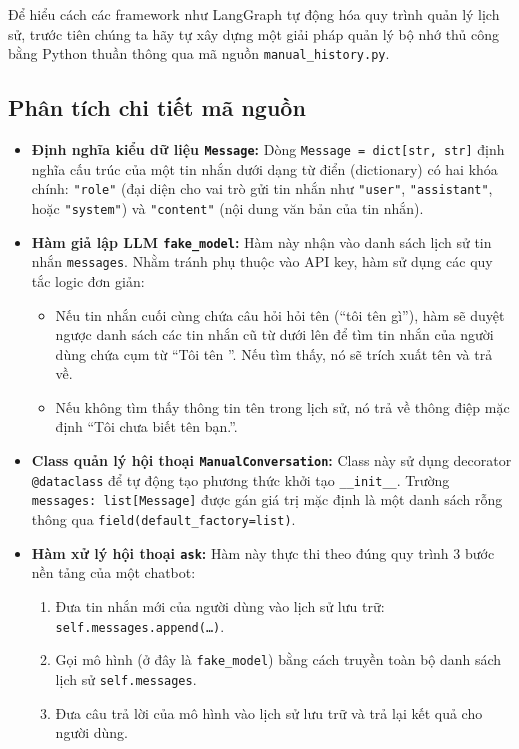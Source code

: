 Để hiểu cách các framework như LangGraph tự động hóa quy trình quản lý lịch sử, trước tiên chúng ta hãy tự xây dựng một giải pháp quản lý bộ nhớ thủ công bằng Python thuần thông qua mã nguồn \texttt{manual\_history.py}.

\begingroup

\endgroup

\subsection{Phân tích chi tiết mã nguồn}
\begin{itemize}
  \item \textbf{Định nghĩa kiểu dữ liệu \texttt{Message}:} Dòng \texttt{Message = dict[str, str]} định nghĩa cấu trúc của một tin nhắn dưới dạng từ điển (dictionary) có hai khóa chính: \texttt{"role"} (đại diện cho vai trò gửi tin nhắn như \texttt{"user"}, \texttt{"assistant"}, hoặc \texttt{"system"}) và \texttt{"content"} (nội dung văn bản của tin nhắn).
  \item \textbf{Hàm giả lập LLM \texttt{fake\_model}:} Hàm này nhận vào danh sách lịch sử tin nhắn \texttt{messages}. Nhằm tránh phụ thuộc vào API key, hàm sử dụng các quy tắc logic đơn giản:
  \begin{itemize}
    \item Nếu tin nhắn cuối cùng chứa câu hỏi hỏi tên (``tôi tên gì''), hàm sẽ duyệt ngược danh sách các tin nhắn cũ từ dưới lên để tìm tin nhắn của người dùng chứa cụm từ ``Tôi tên ''. Nếu tìm thấy, nó sẽ trích xuất tên và trả về.
    \item Nếu không tìm thấy thông tin tên trong lịch sử, nó trả về thông điệp mặc định ``Tôi chưa biết tên bạn.''.
  \end{itemize}
  \item \textbf{Class quản lý hội thoại \texttt{ManualConversation}:} Class này sử dụng decorator \texttt{@dataclass} để tự động tạo phương thức khởi tạo \texttt{\_\_init\_\_}. Trường \texttt{messages: list[Message]} được gán giá trị mặc định là một danh sách rỗng thông qua \texttt{field(default\_factory=list)}.
  \item \textbf{Hàm xử lý hội thoại \texttt{ask}:} Hàm này thực thi theo đúng quy trình 3 bước nền tảng của một chatbot:
  \begin{enumerate}
    \item Đưa tin nhắn mới của người dùng vào lịch sử lưu trữ: \texttt{self.messages.append(\dots)}.
    \item Gọi mô hình (ở đây là \texttt{fake\_model}) bằng cách truyền toàn bộ danh sách lịch sử \texttt{self.messages}.
    \item Đưa câu trả lời của mô hình vào lịch sử lưu trữ và trả lại kết quả cho người dùng.
  \end{enumerate}
\end{itemize}

